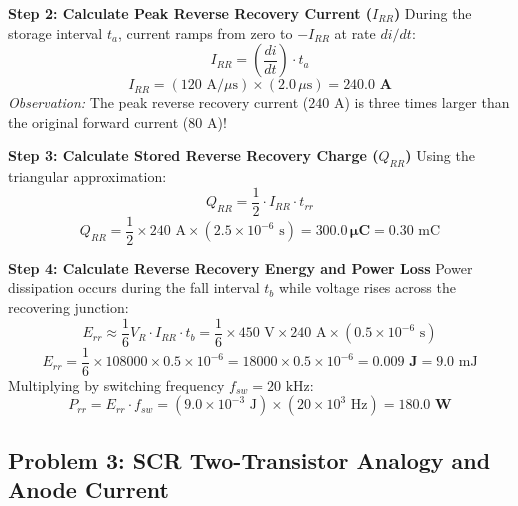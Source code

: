 \documentclass[11pt,a4paper]{article}
\begin{document}
\begin{examplebox}
\textbf{Step 2: Calculate Peak Reverse Recovery Current ($I_{RR}$)}
During the storage interval $t_a$, current ramps from zero to $-I_{RR}$ at rate $di/dt$:
\begin{equation}
I_{RR} = \left(\frac{di}{dt}\right) \cdot t_a
\end{equation}
\begin{equation}
I_{RR} = (120\text{ A}/\mu\text{s}) \times (2.0\,\mu\text{s}) = \mathbf{240.0\text{ A}}
\end{equation}
\textit{Observation:} The peak reverse recovery current ($240\text{ A}$) is three times larger than the original forward current ($80\text{ A}$)!

\textbf{Step 3: Calculate Stored Reverse Recovery Charge ($Q_{RR}$)}
Using the triangular approximation:
\begin{equation}
Q_{RR} = \frac{1}{2} \cdot I_{RR} \cdot t_{rr}
\end{equation}
\begin{equation}
Q_{RR} = \frac{1}{2} \times 240\text{ A} \times (2.5 \times 10^{-6}\text{ s}) = \mathbf{300.0\,\mu\text{C}} = 0.30\text{ mC}
\end{equation}

\textbf{Step 4: Calculate Reverse Recovery Energy and Power Loss}
Power dissipation occurs during the fall interval $t_b$ while voltage rises across the recovering junction:
\begin{equation}
E_{rr} \approx \frac{1}{6} V_R \cdot I_{RR} \cdot t_b = \frac{1}{6} \times 450\text{ V} \times 240\text{ A} \times (0.5 \times 10^{-6}\text{ s})
\end{equation}
\begin{equation}
E_{rr} = \frac{1}{6} \times 108000 \times 0.5 \times 10^{-6} = 18000 \times 0.5 \times 10^{-6} = \mathbf{0.009\text{ J}} = 9.0\text{ mJ}
\end{equation}
Multiplying by switching frequency $f_{sw} = 20\text{ kHz}$:
\begin{equation}
P_{rr} = E_{rr} \cdot f_{sw} = (9.0 \times 10^{-3}\text{ J}) \times (20 \times 10^3\text{ Hz}) = \mathbf{180.0\text{ W}}
\end{equation}
\end{examplebox}

\subsection{Problem 3: SCR Two-Transistor Analogy and Anode Current}
\end{document}

